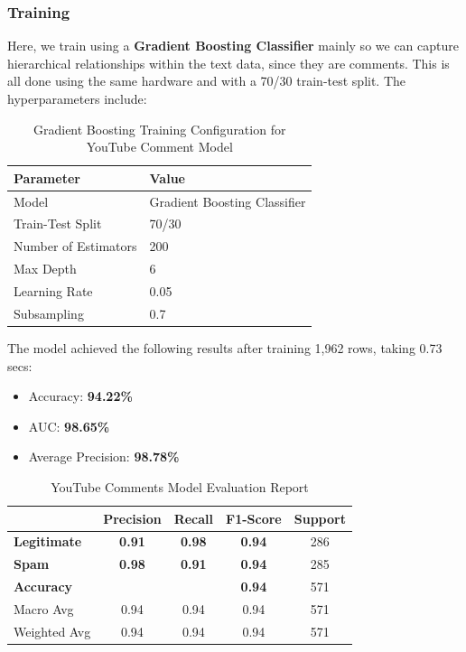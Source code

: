 \documentclass{article}
\begin{document}
\subsubsection*{Training}

Here, we train using a \textbf{Gradient Boosting Classifier} mainly so we can capture hierarchical relationships within the text data, since they are comments. This is all done using the same hardware and with a 70/30 train-test split. The hyperparameters include:

\begin{table}[h!]
    \centering
    \renewcommand{\arraystretch}{1.2}
    \setlength{\tabcolsep}{11pt}
    \begin{tabular}{|l|l|}
        \hline
        \textbf{Parameter} & \textbf{Value} \\
        \hline
        Model & Gradient Boosting Classifier \\
        \hline
        Train-Test Split & 70/30 \\
        \hline
        Number of Estimators & 200 \\
        \hline
        Max Depth & 6 \\
        \hline
        Learning Rate & 0.05 \\
        \hline
        Subsampling & 0.7 \\
        \hline
    \end{tabular}
    \caption{Gradient Boosting Training Configuration for YouTube Comment Model}
\end{table}

\newpage

\noindent
The model achieved the following results after training 1,962 rows, taking 0.73 secs:

\begin{itemize}
    \item Accuracy: \textbf{94.22\%}
    \item AUC: \textbf{98.65\%}
    \item Average Precision: \textbf{98.78\%}
\end{itemize}

\begin{table}[htbp]
    \centering
    \caption{YouTube Comments Model Evaluation Report}
    \begin{tabular}{l c c c c}
    \toprule
     & \textbf{Precision} & \textbf{Recall} & \textbf{F1-Score} & Support \\
    \midrule
    \textbf{Legitimate} & \textbf{0.91} & \textbf{0.98} & \textbf{0.94} & 286 \\
    \textbf{Spam} & \textbf{0.98} & \textbf{0.91} & \textbf{0.94} & 285 \\
    \midrule
    \textbf{Accuracy}  & & & \textbf{0.94} & 571 \\
    Macro Avg & 0.94 & 0.94 & 0.94 & 571 \\
    Weighted Avg & 0.94 & 0.94 & 0.94 & 571 \\
    \bottomrule
    \end{tabular}
    \label{tab:gbm_evaluation}
\end{table}
\end{document}
